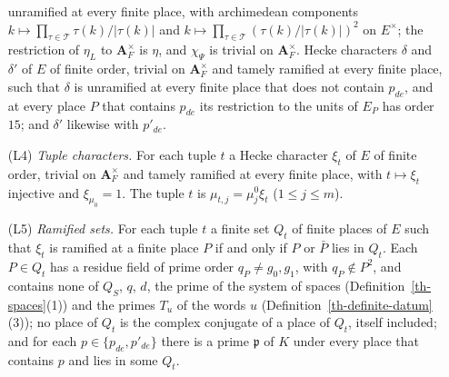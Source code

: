 \begin{definition}
\begin{enumerate}
  unramified at every finite place, with archimedean components
  $k\mapsto\prod_{\tau\in\mathcal T}\tau(k)/|\tau(k)|$ and
  $k\mapsto\prod_{\tau\in\mathcal T}(\tau(k)/|\tau(k)|)^2$ on $E^\times$; the
  restriction of $\eta_L$ to $\mathbf A_F^\times$ is $\eta$, and $\chi_\Psi$ is
  trivial on $\mathbf A_F^\times$. Hecke characters $\delta$ and $\delta'$ of
  $E$ of finite order, trivial on $\mathbf A_F^\times$ and tamely ramified at
  every finite place, such that $\delta$ is unramified at every finite place
  that does not contain $p_{de}$, and at every place $P$ that contains
  $p_{de}$ its restriction to the units of $E_P$ has order $15$; and $\delta'$
  likewise with $p'_{de}$.
\item[(L4)] \emph{Tuple characters.} For each tuple $t$ a Hecke character
  $\xi_t$ of $E$ of finite order, trivial on $\mathbf A_F^\times$ and tamely
  ramified at every finite place, with $t\mapsto\xi_t$ injective and
  $\xi_{\mu_0}=1$. The tuple $t$ is $\mu_{t,j}=\mu^0_j\xi_t$ ($1\leq j\leq m$).
\item[(L5)] \emph{Ramified sets.} For each tuple $t$ a finite set $Q_t$ of
  finite places of $E$ such that $\xi_t$ is ramified at a finite place $P$ if
  and only if $P$ or $\bar P$ lies in $Q_t$. Each $P\in Q_t$ has a residue
  field of prime order $q_P\neq g_0,g_1$, with $q_P\notin P^2$, and contains
  none of $Q_S$, $q$, $d$, the prime of the system of spaces
  (Definition~\ref{th-spaces}(1)) and the primes $T_u$ of the words $u$
  (Definition~\ref{th-definite-datum}(3)); no place of $Q_t$ is the complex
  conjugate of a place of $Q_t$, itself included; and for each
  $p\in\{p_{de},p'_{de}\}$ there is a prime $\mathfrak p$ of $K$ under every
  place that contains $p$ and lies in some $Q_t$.

\end{enumerate}
\end{definition}
